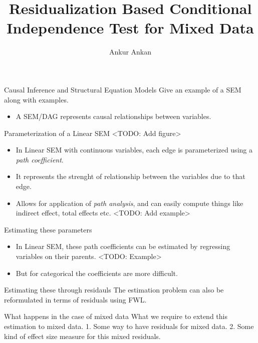 \documentclass{beamer}
\begin{document}
\title[]{Residualization Based Conditional Independence Test for Mixed Data}
\author{Ankur Ankan}
\date{}

\maketitle

\begin{frame}{Causal Inference and Structural Equation Models}
	Give an example of a SEM along with examples.
	\begin{itemize}
		\item A SEM/DAG represents causal relationships between variables.
	\end{itemize}
\end{frame}

\begin{frame}{Parameterization of a Linear SEM}
	<TODO: Add figure>
	\begin{itemize}
		\item In Linear SEM with continuous variables, each edge is parameterized
			using a \emph{path coefficient}.
		\item It represents the strenght of relationship between the variables
			due to that edge.
		\item Allows for application of \emph{path analysis}, and can easily
			compute things like indirect effect, total effects etc.
			<TODO: Add example>
	\end{itemize}
\end{frame}

\begin{frame}{Estimating these parameters}

	\begin{itemize}
		\item In Linear SEM, these path coefficients can be estimated by regressing
			variables on their parents. <TODO: Example>
		\item But for categorical the coefficients are more difficult.
	\end{itemize}
\end{frame}

\begin{frame}{Estimating these through residauls}
	The estimation problem can also be reformulated in terms of residuals using FWL.
\end{frame}

\begin{frame}{What happens in the case of mixed data}
	What we require to extend this estimation to mixed data.
	1. Some way to have residuals for mixed data.
	2. Some kind of effect size measure for this mixed residuals.
\end{frame}
\end{document}
